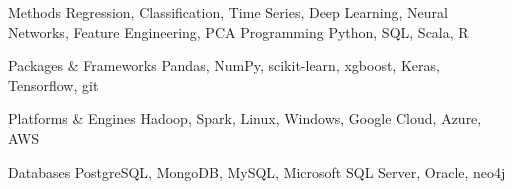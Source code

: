 


\begin{cvskills}


\cvskill
{Methods}
{Regression, Classification, Time Series, Deep Learning, Neural Networks, Feature Engineering, PCA}
\cvskill
{Programming} %
{Python, SQL, Scala, R}

\cvskill
{Packages \& Frameworks}
{Pandas, NumPy, scikit-learn, xgboost, Keras, Tensorflow, git}

\cvskill
{Platforms \& Engines}
{Hadoop, Spark, Linux, Windows, Google Cloud, Azure, AWS}

\cvskill
{Databases}
{PostgreSQL, MongoDB, MySQL, Microsoft SQL Server, Oracle, neo4j}

\end{cvskills}
